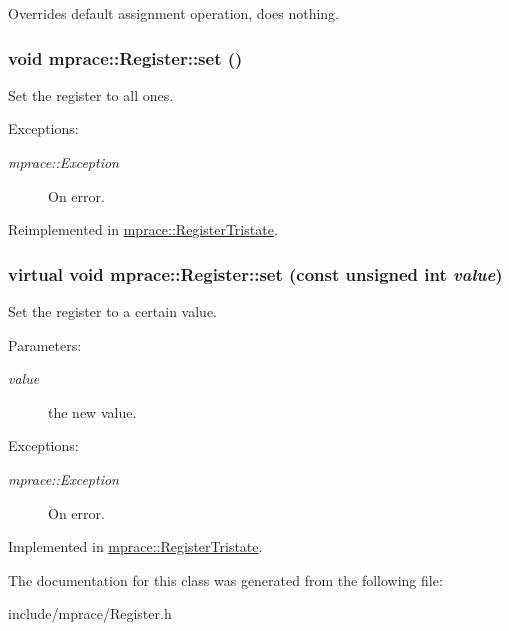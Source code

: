 Overrides default assignment operation, does nothing. 

\hypertarget{classmprace_1_1Register_a3}{
\subsubsection[set]{\setlength{\rightskip}{0pt plus 5cm}void mprace::Register::set ()}}
\label{classmprace_1_1Register_a3}


Set the register to all ones. 

\begin{Desc}
\item[Exceptions:]
\begin{description}
\item[{\em mprace::Exception}]On error.\end{description}
\end{Desc}


Reimplemented in \hyperlink{classmprace_1_1RegisterTristate_a6}{mprace::Register\-Tristate}.\hypertarget{classmprace_1_1Register_a1}{
\subsubsection[set]{\setlength{\rightskip}{0pt plus 5cm}virtual void mprace::Register::set (const unsigned int {\em value})}}
\label{classmprace_1_1Register_a1}


Set the register to a certain value. 

\begin{Desc}
\item[Parameters:]
\begin{description}
\item[{\em value}]the new value. \end{description}
\end{Desc}
\begin{Desc}
\item[Exceptions:]
\begin{description}
\item[{\em mprace::Exception}]On error.\end{description}
\end{Desc}


Implemented in \hyperlink{classmprace_1_1RegisterTristate_a2}{mprace::Register\-Tristate}.

The documentation for this class was generated from the following file:\begin{CompactItemize}
\item 
include/mprace/Register.h\end{CompactItemize}
